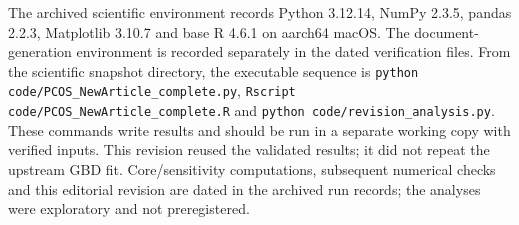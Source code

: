 \documentclass[11pt,a4paper]{article}
\begin{document}
The archived scientific environment records Python 3.12.14, NumPy 2.3.5, pandas 2.2.3, Matplotlib 3.10.7 and base R 4.6.1 on aarch64 macOS. The document-generation environment is recorded separately in the dated verification files. From the scientific snapshot directory, the executable sequence is \texttt{python code/PCOS\_NewArticle\_complete.py}, \texttt{Rscript code/PCOS\_NewArticle\_complete.R} and \texttt{python code/revision\_analysis.py}. These commands write results and should be run in a separate working copy with verified inputs. This revision reused the validated results; it did not repeat the upstream GBD fit. Core/sensitivity computations, subsequent numerical checks and this editorial revision are dated in the archived run records; the analyses were exploratory and not preregistered.
\end{document}
